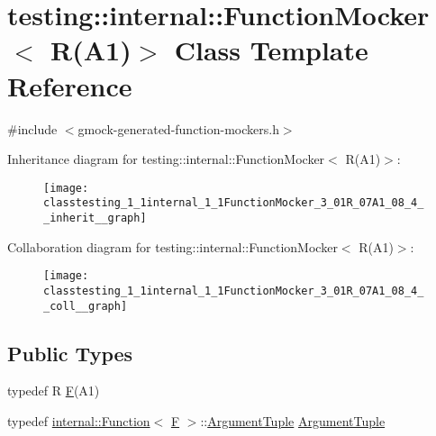 \hypertarget{classtesting_1_1internal_1_1FunctionMocker_3_01R_07A1_08_4}{}\section{testing\+:\+:internal\+:\+:Function\+Mocker$<$ R(A1)$>$ Class Template Reference}
\label{classtesting_1_1internal_1_1FunctionMocker_3_01R_07A1_08_4}


{\ttfamily \#include $<$gmock-\/generated-\/function-\/mockers.\+h$>$}



Inheritance diagram for testing\+:\+:internal\+:\+:Function\+Mocker$<$ R(A1)$>$\+:\nopagebreak
\begin{figure}[H]
\begin{center}
\leavevmode
\texttt{[image: classtesting\_1\_1internal\_1\_1FunctionMocker\_3\_01R\_07A1\_08\_4\_\_inherit\_\_graph]}
\end{center}
\end{figure}


Collaboration diagram for testing\+:\+:internal\+:\+:Function\+Mocker$<$ R(A1)$>$\+:\nopagebreak
\begin{figure}[H]
\begin{center}
\leavevmode
\texttt{[image: classtesting\_1\_1internal\_1\_1FunctionMocker\_3\_01R\_07A1\_08\_4\_\_coll\_\_graph]}
\end{center}
\end{figure}
\subsection*{Public Types}
\begin{DoxyCompactItemize}
\item 
typedef R \hyperlink{classtesting_1_1internal_1_1FunctionMocker_3_01R_07A1_08_4_ada54286442ab14a18c2308cef748848f}{F}(A1)
\item 
typedef \hyperlink{structtesting_1_1internal_1_1Function}{internal\+::\+Function}$<$ \hyperlink{classtesting_1_1internal_1_1FunctionMocker_3_01R_07A1_08_4_ada54286442ab14a18c2308cef748848f}{F} $>$\+::\hyperlink{classtesting_1_1internal_1_1FunctionMocker_3_01R_07A1_08_4_aacec6412ac4343c071d7dfe965558b0b}{Argument\+Tuple} \hyperlink{classtesting_1_1internal_1_1FunctionMocker_3_01R_07A1_08_4_aacec6412ac4343c071d7dfe965558b0b}{Argument\+Tuple}
\end{DoxyCompactItemize}
